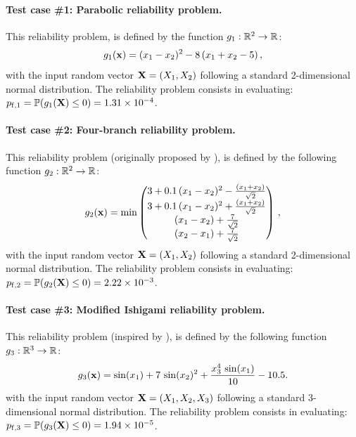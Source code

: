 \paragraph{Test case \#1: Parabolic reliability problem.}
This reliability problem, is defined by the function $g_1: \mathbb{R}^2 \rightarrow \mathbb{R}$:
\begin{equation}
    g_1({\bf x})= (x_1 - x_2) ^ 2 - 8 \, (x_1 + x_2 - 5)\, ,
\end{equation}
with the input random vector ${\bf X} = (X_1, X_2)$ following a standard 2-dimensional normal distribution. 
The reliability problem consists in evaluating: $p_{\mathrm{f}, 1} = \mathbb{P} ( g_1({\bf X}) \leq 0 ) = 1.31 \times 10^{-4}$.

\paragraph{Test case \#2: Four-branch reliability problem.}
This reliability problem (originally proposed by \citealp{waarts2000structural}), is defined by the following function $g_2: \mathbb{R}^2 \rightarrow \mathbb{R}$:
\begin{align}
  g_2({\bf x}) = \min \begin{pmatrix}
    3+0.1 \, (x_1-x_2)^2-\frac{(x_1+x_2)}{\sqrt{2}}\\
    3+0.1\, (x_1-x_2)^2+\frac{(x_1+x_2)}{\sqrt{2}}\\
    (x_1-x_2)+ \frac{7}{\sqrt{2}}\\
    (x_2-x_1)+ \frac{7}{\sqrt{2}}
  \end{pmatrix}\, ,
\end{align}
with the input random vector ${\bf X} = (X_1, X_2)$ following a standard 2-dimensional normal distribution. 
The reliability problem consists in evaluating: $p_{\mathrm{f}, 2} = \mathbb{P} ( g_2({\bf X}) \leq 0 ) =  2.22 \times 10^{-3}$.

\paragraph{Test case \#3: Modified Ishigami reliability problem.}
This reliability problem (inspired by \citealp{lemaitre_2015_PLI}), is defined by the following function $g_3: \mathbb{R}^3 \rightarrow \mathbb{R}$:
\begin{equation}
    g_3({\bf x}) = \sin(x_1) + 7 \, \sin(x_2)^2 + \frac{x_3^4 \, \sin(x_1)}{10} - 10.5.
\end{equation}
with the input random vector ${\bf X} = (X_1, X_2, X_3)$ following a standard 3-dimensional normal distribution. 
The reliability problem consists in evaluating: $p_{\mathrm{f}, 3} = \mathbb{P} ( g_3({\bf X}) \leq 0 ) =  1.94 \times 10^{-5}$.

